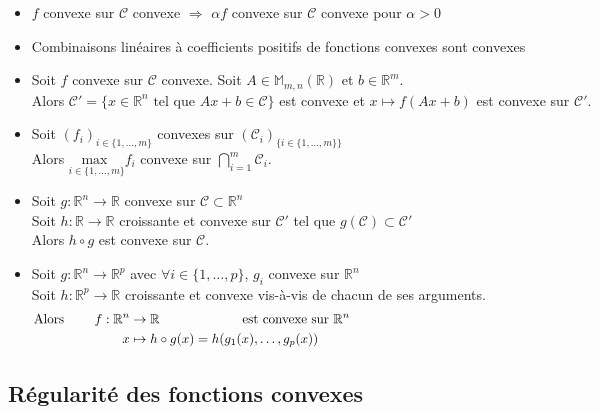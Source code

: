 \documentclass[12pt,a4paper]{article}
\newcommand{\propriete}[2]{%
    \begin{tcolorbox}[colback=white,colframe=green!25!white,title=\textbf{Propriété #1}, coltitle=black]
        #2
    \end{tcolorbox}
}
\begin{document}
\propriete{}{
    \begin{itemize}
        \item $f$ convexe sur $\mathcal{C}$ convexe $\Rightarrow$ $\alpha f$ convexe sur $\mathcal{C}$ convexe pour $\alpha > 0$
        \item Combinaisons linéaires à coefficients positifs de fonctions convexes sont convexes
        \item Soit $f$ convexe sur $\mathcal{C}$ convexe. Soit $A \in \mathbb{M}_{m,n}(\mathbb{R})$ et $b \in \mathbb{R}^m$.\\
        Alors $\mathcal{C}' = \{x \in \mathbb{R}^n \text{ tel que } Ax + b \in \mathcal{C}\}$ est convexe et $x \mapsto f(Ax + b)$ est convexe sur $\mathcal{C}'$.
        \item Soit $(f_i)_{i \in \{1, \dots, m\}}$ convexes sur $(\mathcal{C}_i)_{\{i \in \{1, \dots, m\}\}}$\\
        Alors $\underset{i \in \{1, \dots, m\}}{\text{max }} f_i$ convexe sur $\bigcap_{i=1}^{m} \mathcal{C}_i$.
        \item Soit $g : \mathbb{R}^n \rightarrow \mathbb{R}$ convexe sur $\mathcal{C} \subset \mathbb{R}^n$\\
        Soit $h : \mathbb{R} \rightarrow \mathbb{R}$ croissante et convexe sur $\mathcal{C}'$ tel que $g(\mathcal{C}) \subset \mathcal{C}'$\\
        Alors $h \circ g$ est convexe sur $\mathcal{C}$.
        \item Soit $g : \mathbb{R}^n \rightarrow \mathbb{R}^p$ avec $\forall i \in \{1, \dots, p\}$, $g_i$ convexe sur $\mathbb{R}^n$\\
        Soit $h : \mathbb{R}^p \rightarrow \mathbb{R}$ croissante et convexe vis-à-vis de chacun de ses arguments.
        \vspace{-\baselineskip}\begin{align*}
            \text{Alors } \qquad f : \mathbb{R}^n &\rightarrow \mathbb{R} \qquad \qquad \qquad  \text{ est convexe sur } \mathbb{R}^n \hspace{14.5cm}\\
            x &\mapsto h \circ g(x) = h(g_1(x), \dots, g_p(x))
        \end{align*}
    \end{itemize}
}


\subsection{Régularité des fonctions convexes}
\end{document}
